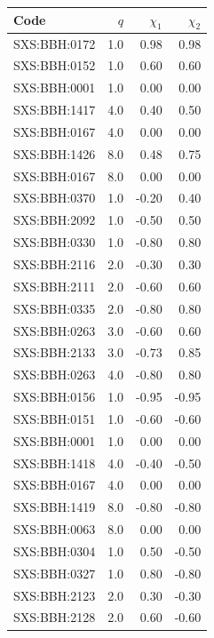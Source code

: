 \documentclass[twocolumn]{aastex631}
\begin{document}
\begin{table}[t]
	\begin{tabularx}{0.8\columnwidth}{@{\extracolsep{\fill}}lrrr}
		\toprule\midrule
		Code         & $q$ & $\chi_1$ & $\chi_2$ \\ \midrule\midrule
		SXS:BBH:0172 & 1.0 & 0.98     & 0.98     \\
		SXS:BBH:0152 & 1.0 & 0.60     & 0.60     \\
		SXS:BBH:0001 & 1.0 & 0.00     & 0.00     \\
		SXS:BBH:1417 & 4.0 & 0.40     & 0.50     \\
		SXS:BBH:0167 & 4.0 & 0.00     & 0.00     \\
		SXS:BBH:1426 & 8.0 & 0.48     & 0.75     \\
		SXS:BBH:0167 & 8.0 & 0.00     & 0.00     \\ \midrule
		SXS:BBH:0370 & 1.0 & -0.20    & 0.40     \\
		SXS:BBH:2092 & 1.0 & -0.50    & 0.50     \\
		SXS:BBH:0330 & 1.0 & -0.80    & 0.80     \\
		SXS:BBH:2116 & 2.0 & -0.30    & 0.30     \\
		SXS:BBH:2111 & 2.0 & -0.60    & 0.60     \\
		SXS:BBH:0335 & 2.0 & -0.80    & 0.80     \\
		SXS:BBH:0263 & 3.0 & -0.60    & 0.60     \\
		SXS:BBH:2133 & 3.0 & -0.73    & 0.85     \\
		SXS:BBH:0263 & 4.0 & -0.80    & 0.80     \\ \midrule
		SXS:BBH:0156 & 1.0 & -0.95    & -0.95    \\
		SXS:BBH:0151 & 1.0 & -0.60    & -0.60    \\
		SXS:BBH:0001 & 1.0 & 0.00     & 0.00     \\
		SXS:BBH:1418 & 4.0 & -0.40    & -0.50    \\
		SXS:BBH:0167 & 4.0 & 0.00     & 0.00     \\
		SXS:BBH:1419 & 8.0 & -0.80    & -0.80    \\
		SXS:BBH:0063 & 8.0 &  0.00    &  0.00    \\ \midrule
		SXS:BBH:0304 & 1.0 & 0.50     & -0.50    \\
		SXS:BBH:0327 & 1.0 & 0.80     & -0.80    \\
		SXS:BBH:2123 & 2.0 & 0.30     & -0.30    \\
		SXS:BBH:2128 & 2.0 & 0.60     & -0.60    \\

\end{tabularx}
\end{table}
\end{document}
